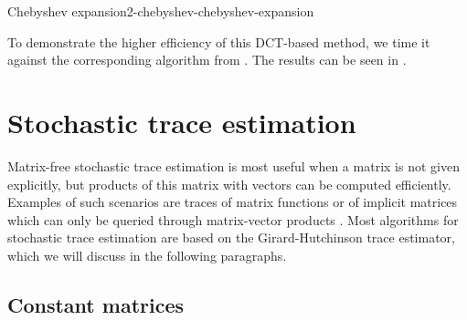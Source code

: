 \begin{algo}{Chebyshev expansion}{2-chebyshev-chebyshev-expansion}
    
\end{algo}

To demonstrate the higher efficiency of this \gls{DCT}-based method, we time it
against the corresponding algorithm from \cite{lin2017randomized}. The results
can be seen in .

\begin{table}[ht]
    \caption{Comparison of the runtime in milliseconds of the two approaches for computing the coefficients
        of the Chebyshev expansion of a function. We average over 7 runs of the
        algorithms and repeat these runs 1000 times to form the mean and standard
        deviation which are given in the below table. We refer to
        \cite[algorithm~1]{lin2017randomized} with \enquote{quadrature}
        and to  with \enquote{DCT}.
        For each algorithm, we interpolate a Gaussian \gls{smoothing-kernel} with \gls{smoothing-parameter} $=0.05$,
        at \gls{num-evaluation-points} $=1000$ points, for various values of \gls{chebyshev-degree}.}
    \label{tab:2-chebyshev-timing-interpolation}
   
\end{table}


\section{Stochastic trace estimation}
\label{sec:2-chebyshev-stochastic-trace-estimation}

Matrix-free stochastic trace estimation is most useful when a matrix is not given
explicitly, but products of this matrix with vectors can be computed
efficiently. Examples of such scenarios are traces of matrix functions
\cite{ubaru2017lanczos,epperly2023xtrace} or of implicit matrices which can only
be queried through matrix-vector products \cite{ghorbani2019investigation,adepu2021hessian}.
Most algorithms for stochastic trace estimation are based on the Girard-Hutchinson
trace estimator, which we will discuss in the following paragraphs.\\

\subsection{Constant matrices}
\label{subsec:2-chebyshev-trace-constant}

